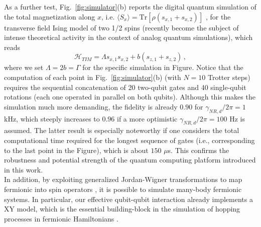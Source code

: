 \documentclass[aps,twocolumn,groupedaddress,superscriptaddress,floatfix,amsmath,amssymb,prb]{revtex4-1}
\begin{document}
As a further test, Fig.~\ref{fig:simulator}(b) reports the digital quantum simulation of the total magnetization along $x$, i.e. $\langle S_x \rangle=\mathrm{Tr}[\rho(s_{x,1} + s_{x,2})]$ \cite{Sx}, for the transverse field Ising model of two 1/2 spins {(recently become the subject of intense theoretical activity in the context of analog quantum simulations\cite{Tian2010,Viehmann2013,You2013,Du2015})}, which reads
\begin{equation}
\mathcal{H}_{TIM} = \Lambda s_{x,1} s_{x,2}  + b (s_{z,1} + s_{z,2})  \, ,
\label{eq:H_TIM}
\end{equation}
where we set $\Lambda = 2 b = \Gamma$  for the specific simulation in Figure. 
Notice that the computation of each point in Fig.~\ref{fig:simulator}(b) (with $N=10$ Trotter steps) requires the sequential concatenation of 20 two-qubit gates and 40 single-qubit rotations (each one operated in parallel on both qubits). Although this makes the simulation much more demanding, 
the fidelity is already $0.90$ for $\gamma_{NR,d}/ 2\pi =1$ kHz, which steeply increases to $0.96$ if a more optimistic  $\gamma_{NR,d}/ 2\pi =100$ Hz is assumed. The latter result is especially noteworthy if one considers the total computational time required for the longest sequence of gates (i.e.,  corresponding to the last point in the Figure), which is about $150$ $\mu$s. This confirms the robustness and potential strength of the quantum computing platform introduced in this work. \\
{ In addition, by exploiting generalized Jordan-Wigner transformations to map fermionic into spin operators \cite{Laflamme,Bari,Santini2011}, it is possible to simulate many-body fermionic systems. 
In particular, our effective qubit-qubit interaction already implements a XY model, which is the essential building-block in the simulation of hopping processes in fermionic Hamiltonians \cite{Chiesa2015,Reiner2016}. }
\end{document}
